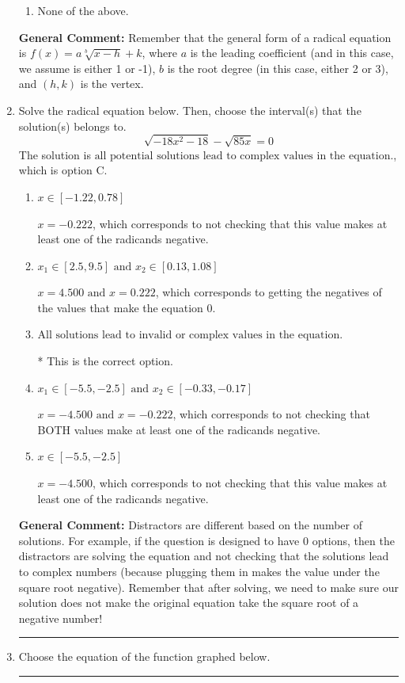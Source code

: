 \documentclass{extbook}[14pt]
\newcommand{\litem}[1]{\item #1

\rule{\textwidth}{0.4pt}}
\begin{document}
\begin{enumerate}
{\begin{enumerate}[label=\Alph*.]
\item None of the above.\end{enumerate}
\textbf{General Comment:} Remember that the general form of a radical equation is $ f(x) = a \sqrt[b]{x - h} + k $, where $a$ is the leading coefficient (and in this case, we assume is either 1 or -1), $b$ is the root degree (in this case, either 2 or 3), and $(h, k)$ is the vertex.
}
\litem{
Solve the radical equation below. Then, choose the interval(s) that the solution(s) belongs to.
\[ \sqrt{-18 x^2 - 18} - \sqrt{85 x} = 0 \]The solution is \( \text{all potential solutions lead to complex values in the equation.} \), which is option C.\begin{enumerate}[label=\Alph*.]
\item \( x \in [-1.22,0.78] \)

$x = -0.222$, which corresponds to not checking that this value makes at least one of the radicands negative.
\item \( x_1 \in [2.5, 9.5] \text{ and } x_2 \in [0.13,1.08] \)

$x = 4.500 \text{ and } x = 0.222$, which corresponds to getting the negatives of the values that make the equation 0.
\item \( \text{All solutions lead to invalid or complex values in the equation.} \)

* This is the correct option.
\item \( x_1 \in [-5.5, -2.5] \text{ and } x_2 \in [-0.33,-0.17] \)

$x = -4.500 \text{ and } x = -0.222$, which corresponds to not checking that BOTH values make at least one of the radicands negative.
\item \( x \in [-5.5,-2.5] \)

$x = -4.500$, which corresponds to not checking that this value makes at least one of the radicands negative.
\end{enumerate}

\textbf{General Comment:} Distractors are different based on the number of solutions. For example, if the question is designed to have 0 options, then the distractors are solving the equation and not checking that the solutions lead to complex numbers (because plugging them in makes the value under the square root negative). Remember that after solving, we need to make sure our solution does not make the original equation take the square root of a negative number!
}
\litem{
Choose the equation of the function graphed below.

}
\end{enumerate}
\end{document}

